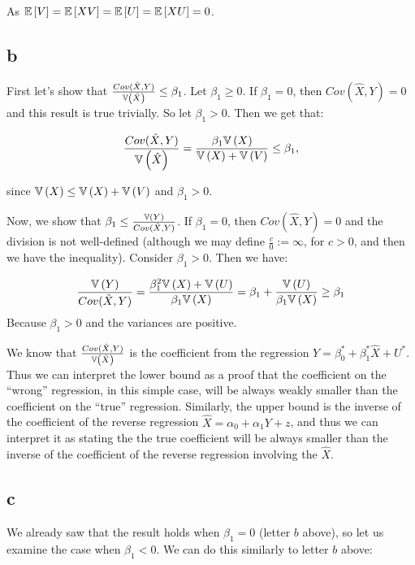 \documentclass[12pt]{paper}
\begin{document}
As $\mathbb{E} \left [ V \right ] = \mathbb{E} \left [ XV \right ] = \mathbb{E} \left [ U \right ] = \mathbb{E} \left [ XU \right ] = 0$.

\subsection*{b}

First let's show that $ \frac{Cov( \hat{X}, Y)}{\mathbb{V} \left ( \hat{X} \right )}\le \beta_1$. Let $\beta_1 \geq 0$. If
$\beta_1 = 0$, then $Cov( \hat{X}, Y) = 0$  and this result is true
trivially. So let $\beta_1 > 0$. Then we get that:

\begin{equation*}
  \frac{Cov( \hat{X}, Y)}{\mathbb{V} \left ( \hat{X} \right )} = \frac{\beta_1 \mathbb{V} \left ( X \right )}{\mathbb{V} \left ( X \right ) + \mathbb{V} \left ( V \right )} \leq \beta_1,
\end{equation*}

since $\mathbb{V} \left ( X \right ) \leq \mathbb{V} \left ( X \right ) + \mathbb{V} \left ( V \right )$ and $\beta_1 > 0$.

Now, we show that $\beta_1\le \frac{\mathbb{V} \left ( Y \right )}{Cov( \hat{X}, Y)}$. If $\beta_1=0$, then $Cov( \hat{X}, Y) = 0$ and the division is not well-defined (although we may define $\frac{c}{0}:=\infty$, for $c>0$, and then we have the inequality). Consider $\beta_1>0$. Then we have:

\begin{align*}
  \frac{\mathbb{V} \left ( Y \right )}{Cov( \hat{X}, Y)}=\frac{\beta_1^2 \mathbb{V} \left ( X \right ) + \mathbb{V} \left ( U \right )}{\beta_1 \mathbb{V} \left ( X \right )}=\beta_1+\frac{\mathbb{V} \left ( U \right )}{\beta_1 \mathbb{V} \left ( X \right )}\ge \beta_1
\end{align*}
Because $\beta_1>0$ and the variances are positive.

We know that $\frac{Cov( \hat{X}, Y)}{\mathbb{V} \left ( \hat{X} \right )}$ is the coefficient from the regression $Y=\beta_0^*+\beta_1^*\hat{X}+U^*$. Thus we can interpret the lower bound as a proof that the coefficient on the ``wrong'' regression, in this simple case, will be always weakly smaller than the coefficient on the ``true'' regression. Similarly, the upper bound is the inverse of the coefficient of the reverse regression $\hat{X}=\alpha_0+\alpha_1Y+z$, and thus we can interpret it as stating the the true coefficient will be always smaller than the inverse of the coefficient of the reverse regression involving the $\hat{X}$.

\subsection*{c}

We already saw that the result holds when $\beta_1 = 0$ (letter $b$ above), so let us examine the case when
$\beta_1 < 0$. We can do this similarly to letter $b$ above:
\end{document}
